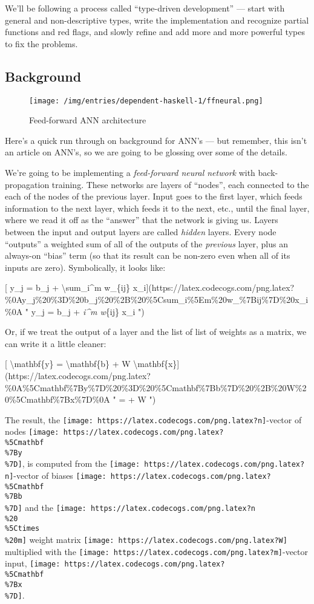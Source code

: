 \documentclass[]{article}
\begin{document}
We'll be following a process called ``type-driven development'' --- start with
general and non-descriptive types, write the implementation and recognize
partial functions and red flags, and slowly refine and add more and more
powerful types to fix the problems.

\hypertarget{background}{%
\subsection{Background}\label{background}}

\begin{figure}
\centering
\texttt{[image: /img/entries/dependent-haskell-1/ffneural.png]}
\caption{Feed-forward ANN architecture}
\end{figure}

Here's a quick run through on background for ANN's --- but remember, this isn't
an article on ANN's, so we are going to be glossing over some of the details.

We're going to be implementing a \emph{feed-forward neural network} with
back-propagation training. These networks are layers of ``nodes'', each
connected to the each of the nodes of the previous layer. Input goes to the
first layer, which feeds information to the next layer, which feeds it to the
next, etc., until the final layer, where we read it off as the ``answer'' that
the network is giving us. Layers between the input and output layers are called
\emph{hidden} layers. Every node ``outputs'' a weighted sum of all of the
outputs of the \emph{previous} layer, plus an always-on ``bias'' term (so that
its result can be non-zero even when all of its inputs are zero). Symbolically,
it looks like:

{[} y\_j = b\_j + \textbackslash sum\_i\^{}m w\_\{ij\}
x\_i{]}(https://latex.codecogs.com/png.latex?\%0Ay\_j\%20\%3D\%20b\_j\%20\%2B\%20\%5Csum\_i\%5Em\%20w\_\%7Bij\%7D\%20x\_i\%0A
" y\_j = b\_j + \sum\emph{i\^{}m w}\{ij\} x\_i ")

Or, if we treat the output of a layer and the list of list of weights as a
matrix, we can write it a little cleaner:

{[} \textbackslash mathbf\{y\} = \textbackslash mathbf\{b\} + W
\textbackslash mathbf\{x\}{]}(https://latex.codecogs.com/png.latex?\%0A\%5Cmathbf\%7By\%7D\%20\%3D\%20\%5Cmathbf\%7Bb\%7D\%20\%2B\%20W\%20\%5Cmathbf\%7Bx\%7D\%0A
"  =  + W  ")

The result, the \texttt{[image: https://latex.codecogs.com/png.latex?n]}-vector
of nodes
\texttt{[image: https://latex.codecogs.com/png.latex?\\\%5Cmathbf\\\%7By\\\%7D]}, is
computed from the
\texttt{[image: https://latex.codecogs.com/png.latex?n]}-vector of biases
\texttt{[image: https://latex.codecogs.com/png.latex?\\\%5Cmathbf\\\%7Bb\\\%7D]} and
the \texttt{[image: https://latex.codecogs.com/png.latex?n\\\%20\\\%5Ctimes\\\%20m]}
weight matrix \texttt{[image: https://latex.codecogs.com/png.latex?W]}
multiplied with the
\texttt{[image: https://latex.codecogs.com/png.latex?m]}-vector input,
\texttt{[image: https://latex.codecogs.com/png.latex?\\\%5Cmathbf\\\%7Bx\\\%7D]}.
\end{document}
